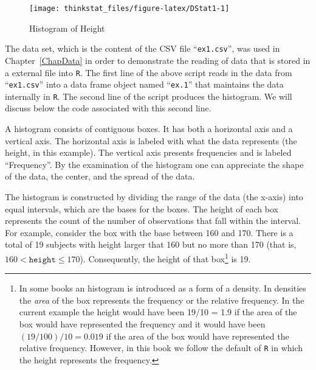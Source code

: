 \documentclass[]{krantz}
\makeatletter
\newenvironment{Shaded}{\begin{snugshade}}{\end{snugshade}}
\newcommand{\KeywordTok}[1]{\textcolor[rgb]{0.13,0.29,0.53}{\textbf{#1}}}
\newcommand{\DecValTok}[1]{\textcolor[rgb]{0.00,0.00,0.81}{#1}}
\newcommand{\StringTok}[1]{\textcolor[rgb]{0.31,0.60,0.02}{#1}}
\newcommand{\OperatorTok}[1]{\textcolor[rgb]{0.81,0.36,0.00}{\textbf{#1}}}
\newcommand{\NormalTok}[1]{#1}
\newenvironment{kframe}{%
\medskip{}
\setlength{\fboxsep}{.8em}
 \def\at@end@of@kframe{}%
 \ifinner\ifhmode%
  \def\at@end@of@kframe{\end{minipage}}%
  \begin{minipage}{\columnwidth}%
 \fi\fi%
 \def\FrameCommand##1{\hskip\@totalleftmargin \hskip-\fboxsep
 \colorbox{shadecolor}{##1}\hskip-\fboxsep
     \hskip-\linewidth \hskip-\@totalleftmargin \hskip\columnwidth}%
 \MakeFramed {\advance\hsize-\width
   \@totalleftmargin\z@ \linewidth\hsize
   \@setminipage}}%
 {\par\unskip\endMakeFramed%
 \at@end@of@kframe}
\renewenvironment{Shaded}{\begin{kframe}}{\end{kframe}}
\theoremstyle{definition}
\theoremstyle{definition}
\theoremstyle{definition}
\theoremstyle{remark}
\makeatother
\begin{document}
\begin{Shaded}
\end{Shaded}

\begin{figure}

{\centering \texttt{[image: thinkstat\_files/figure-latex/DStat1-1]} 

}

\caption{Histogram of Height}\label{fig:DStat1}
\end{figure}

The data set, which is the content of the CSV file ``\texttt{ex1.csv}'',
was used in Chapter~\ref{ChapData} in order to demonstrate the reading
of data that is stored in a external file into \texttt{R}. The first
line of the above script reads in the data from ``\texttt{ex1.csv}''
into a data frame object named ``\texttt{ex.1}'' that maintains the data
internally in \texttt{R}. The second line of the script produces the
histogram. We will discuss below the code associated with this second
line.

A histogram consists of contiguous boxes. It has both a horizontal axis
and a vertical axis. The horizontal axis is labeled with what the data
represents (the height, in this example). The vertical axis presents
frequencies and is labeled ``Frequency''. By the examination of the
histogram one can appreciate the shape of the data, the center, and the
spread of the data.

The histogram is constructed by dividing the range of the data (the
x-axis) into equal intervals, which are the bases for the boxes. The
height of each box represents the count of the number of observations
that fall within the interval. For example, consider the box with the
base between 160 and 170. There is a total of 19 subjects with height
larger that 160 but no more than 170 (that is,
\(160 < \texttt{height} \leq 170\)). Consequently, the height of that
box\footnote{In some books an histogram is introduced as a form of a
  density. In densities the \emph{area} of the box represents the
  frequency or the relative frequency. In the current example the height
  would have been 19/10 = 1.9 if the area of the box would have
  represented the frequency and it would have been
  \((19/100)/10 = 0.019\) if the area of the box would have represented
  the relative frequency. However, in this book we follow the default of
  \texttt{R} in which the height represents the frequency.} is 19.
\end{document}
